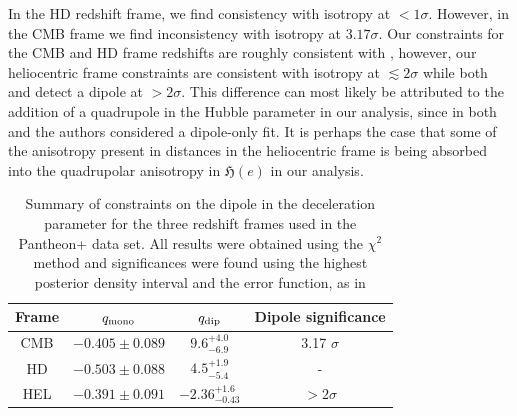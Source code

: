 \documentclass[fleqn,usenatbib]{mnras}
\newcommand{\jess}[1]{\textcolor{magenta} {\textbf{[JAC]:{#1}}}}
\begin{document}
In the HD redshift frame, we find consistency with isotropy at $<1\sigma$. %
However, in the CMB frame 
{we find} inconsistency with isotropy {{at $3.17 \sigma$. }
Our constraints for the CMB and HD frame redshifts are {roughly consistent} with , however, our heliocentric frame constraints are consistent with isotropy at $\lesssim 2\sigma$ while both  and \citet{Sarkar2019} detect a dipole at $>2\sigma$. This difference can most likely be attributed to the addition of a quadrupole in the Hubble parameter in our analysis, since in both  and \citet{Sarkar2019} the authors considered a dipole-only fit. It is perhaps the case that some of the anisotropy present in distances in the heliocentric frame is being absorbed into the quadrupolar anisotropy in $\mathfrak{H}(e)$ in our analysis.} %


\begin{table}
    \centering
    \begin{tabular}{c|c|c|c|}
    \hline
         Frame & $q_{\rm mono}$ & $q_{\rm dip}$ & Dipole significance \\
        \hline
        CMB & $-0.405\pm 0.089
        $& $9.6^{+4.0}_{-6.9}$ & 3.17 $\sigma$\\
                HD & $-0.503\pm 0.088
        $ & $ 4.5^{+1.9}_{-5.4}$ & - \\
                HEL & $ -0.391\pm 0.091
        $ &  $-2.36^{+1.6}_{-0.43} $ & $>2\sigma$\\
    \hline
    \end{tabular}
    \caption{{Summary of constraints on the dipole in the deceleration parameter for the three redshift frames used in the Pantheon+ data set. All results were obtained using the $\chi^2$ method and %
    significances were found using the highest posterior density interval and the error function, as in }}
    \label{tab:redshift_dipole}
\end{table}
\end{document}
